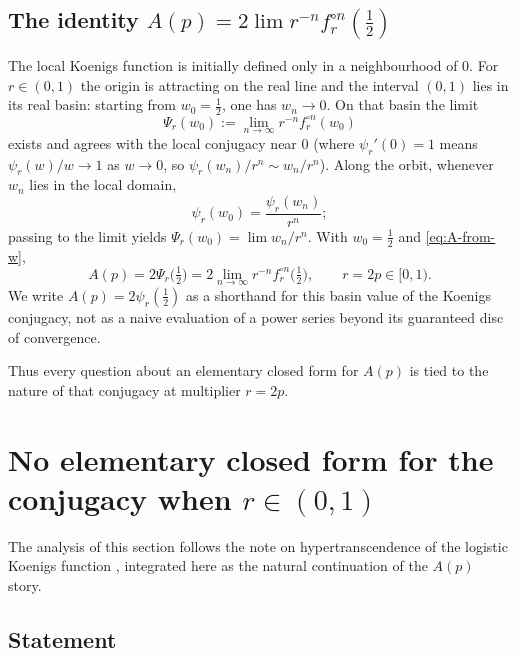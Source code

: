 \documentclass[11pt,a4paper]{article}
\theoremstyle{plain}
\theoremstyle{definition}
\begin{document}
\subsection{The identity $A(p)=2\lim r^{-n}f_r^{\circ n}(\tfrac12)$}

The local Koenigs function is initially defined only in a neighbourhood of $0$. For $r\in(0,1)$ the origin is attracting on the real line and the interval $(0,1)$ lies in its real basin: starting from $w_0=\tfrac12$, one has $w_n\to0$. On that basin the limit
\begin{equation}
\label{eq:basin-koenigs}
\Psi_r(w_0)
:=
\lim_{n\to\infty} r^{-n} f_r^{\circ n}(w_0)
\end{equation}
exists and agrees with the local conjugacy near $0$ (where $\psi_r'(0)=1$ means $\psi_r(w)/w\to1$ as $w\to0$, so $\psi_r(w_n)/r^n\sim w_n/r^n$). Along the orbit, whenever $w_n$ lies in the local domain,
\[
\psi_r(w_0)=\frac{\psi_r(w_n)}{r^n};
\]
passing to the limit yields $\Psi_r(w_0)=\lim w_n/r^n$. With $w_0=\tfrac12$ and \eqref{eq:A-from-w},
\begin{equation}
\label{eq:A-koenigs}
A(p)
=
2\Psi_r\bigl(\tfrac12\bigr)
=
2\lim_{n\to\infty} r^{-n} f_r^{\circ n}\bigl(\tfrac12\bigr),
\qquad r=2p\in[0,1).
\end{equation}
We write $A(p)=2\psi_r(\tfrac12)$ as a shorthand for this basin value of the Koenigs conjugacy, not as a naive evaluation of a power series beyond its guaranteed disc of convergence.

Thus every question about an elementary closed form for $A(p)$ is tied to the nature of that conjugacy at multiplier $r=2p$.

\section{No elementary closed form for the conjugacy when $r\in(0,1)$}
\label{sec:ncf-main}

The analysis of this section follows the note on hypertranscendence of the logistic Koenigs function \cite{Koenigs1884,Becker1995}, integrated here as the natural continuation of the $A(p)$ story.

\subsection{Statement}
\end{document}
